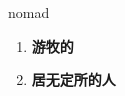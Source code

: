 
\begin{frame}
{\huge nomad}
\begin{center}
\begin{enumerate}\Large
  \item \textbf{游牧的}
  \item \textbf{居无定所的人}
\end{enumerate}
\end{center}
\end{frame}
